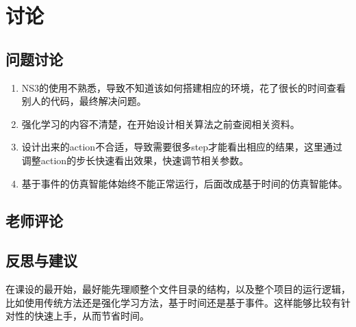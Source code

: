 \section{讨论}

\subsection{问题讨论}

\begin{enumerate}
\item NS3的使用不熟悉，导致不知道该如何搭建相应的环境，花了很长的时间查看别人的代码，最终解决问题。
\item 强化学习的内容不清楚，在开始设计相关算法之前查阅相关资料。
\item 设计出来的action不合适，导致需要很多step才能看出相应的结果，这里通过调整action的步长快速看出效果，快速调节相关参数。
\item 基于事件的仿真智能体始终不能正常运行，后面改成基于时间的仿真智能体。
\end{enumerate}

\subsection{老师评论}

\subsection{反思与建议}

在课设的最开始，最好能先理顺整个文件目录的结构，以及整个项目的运行逻辑，比如使用传统方法还是强化学习方法，基于时间还是基于事件。这样能够比较有针对性的快速上手，从而节省时间。